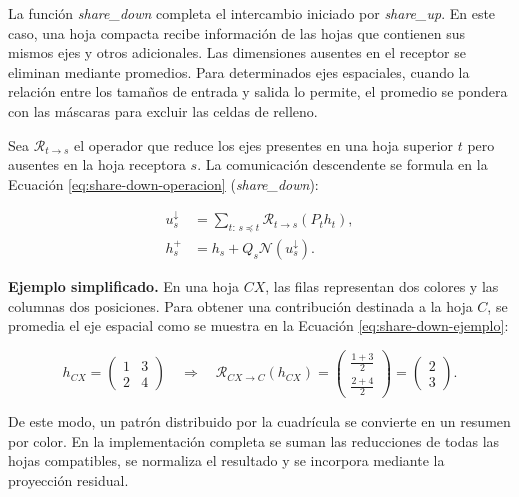 \documentclass[11pt,a4paper,spanish]{book}
\numberwithin{equation}{chapter}
\numberwithin{figure}{chapter}
\begin{document}
La función \textit{share\_down} completa el intercambio iniciado por \textit{share\_up}. En este caso, una hoja compacta recibe
información de las hojas que contienen sus mismos ejes y otros adicionales. Las dimensiones ausentes en el receptor se eliminan mediante
promedios. Para determinados ejes espaciales, cuando la relación entre los tamaños de entrada y salida lo permite, el promedio se
pondera con las máscaras para excluir las celdas de relleno.

Sea \(\mathcal{R}_{t\rightarrow s}\) el operador que reduce los ejes presentes en una hoja superior \(t\) pero ausentes en la hoja
receptora \(s\). La comunicación descendente se formula en la Ecuación \eqref{eq:share-down-operacion} (\textit{share\_down}):

\begin{equation}\label{eq:share-down-operacion}
\begin{aligned}
u_s^{\downarrow}
    &=\sum_{t:\,s\preceq t}
      \mathcal{R}_{t\rightarrow s}(P_t h_t),\\
h_s^{+}
    &=h_s+Q_s\mathcal{N}\!\left(u_s^{\downarrow}\right).
\end{aligned}
\end{equation}

\textbf{Ejemplo simplificado.} En una hoja \(CX\), las filas representan dos colores y las columnas dos posiciones. Para obtener una
contribución destinada a la hoja \(C\), se promedia el eje espacial como se muestra en la Ecuación
\eqref{eq:share-down-ejemplo}:

\begin{equation}\label{eq:share-down-ejemplo}
h_{CX}=\begin{pmatrix}1&3\\2&4\end{pmatrix}
\quad\Longrightarrow\quad
\mathcal{R}_{CX\rightarrow C}(h_{CX})
=\begin{pmatrix}
\frac{1+3}{2}\\[1mm]
\frac{2+4}{2}
\end{pmatrix}
=\begin{pmatrix}2\\3\end{pmatrix}.
\end{equation}

De este modo, un patrón distribuido por la cuadrícula se convierte en un resumen por color. En la implementación completa se suman
las reducciones de todas las hojas compatibles, se normaliza el resultado y se incorpora mediante la proyección residual.
\end{document}
